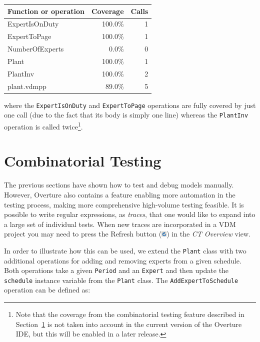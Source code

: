 \begin{longtable}{|l|r|r|}
\hline
Function or operation & Coverage & Calls \\
\hline
\hline
ExpertIsOnDuty & 100.0\% & 1 \\
\hline
ExpertToPage & 100.0\% & 1 \\
\hline
NumberOfExperts & 0.0\% & 0 \\
\hline
Plant & 100.0\% & 1 \\
\hline
PlantInv & 100.0\% & 2 \\
\hline
\hline
plant.vdmpp & 89.0\% & 5 \\
\hline
\end{longtable}

\noindent where the \texttt{ExpertIsOnDuty} and \texttt{ExpertToPage}
operations are fully covered by just one call (due to the fact that
its body is simply one line) whereas the \texttt{PlantInv} operation
is called twice\footnote{Note that the coverage from the combinatorial
  testing feature described in Section~\ref{sec:CT} is not taken into
  account in the current version of the Overture IDE, but this will be
  enabled in a later release.}.


\section{Combinatorial Testing}\label{sec:CT}

The previous sections have shown how to test and debug models
manually. However, Overture also contains a feature enabling more
automation in the testing process, making more comprehensive
high-volume testing feasible. It is possible to write regular
expressions, as \emph{traces}, that one would like to expand into a
large set of individual tests. When new traces are incorporated in a
VDM project you may need to press the \textsf{Refresh} button
(\includegraphics[width=0.02\textwidth]{figures/refresh}) in the
\emph{CT Overview} view.

In order to illustrate how this can be used, we extend the
\texttt{Plant} class with two additional operations for adding and
removing experts from a given schedule. Both operations take a given
\texttt{Period} and an \texttt{Expert} and then update the
\texttt{schedule} instance variable from the \texttt{Plant} class. The
\texttt{AddExpertToSchedule} operation can be defined as:


